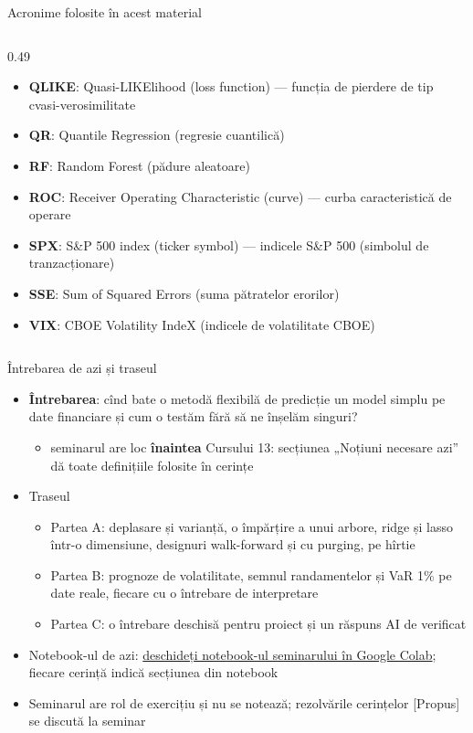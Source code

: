 \begin{frame}{Acronime folosite în acest material}
\begin{columns}[T]
\begin{column}{0.49\textwidth}
\begin{itemize}
    \item \textbf{QLIKE}: Quasi-LIKElihood (loss function) — funcția de pierdere de tip cvasi-verosimilitate
    \item \textbf{QR}: Quantile Regression (regresie cuantilică)
    \item \textbf{RF}: Random Forest (pădure aleatoare)
    \item \textbf{ROC}: Receiver Operating Characteristic (curve) — curba caracteristică de operare
    \item \textbf{SPX}: S\&P 500 index (ticker symbol) — indicele S\&P 500 (simbolul de tranzacționare)
    \item \textbf{SSE}: Sum of Squared Errors (suma pătratelor erorilor)
    \item \textbf{VIX}: CBOE Volatility IndeX (indicele de volatilitate CBOE)
\end{itemize}
\end{column}
\end{columns}
\end{frame}

\begin{frame}{Întrebarea de azi și traseul}
\itemsize{\small}
\begin{itemize}
    \item \textbf{Întrebarea}: cînd bate o metodă flexibilă de predicție un model simplu pe date financiare și cum o testăm fără să ne înșelăm singuri?
    \begin{itemize}
        \item seminarul are loc \textbf{înaintea} Cursului 13: secțiunea „Noțiuni necesare azi” dă toate definițiile folosite în cerințe
    \end{itemize}
    \item Traseul
    \begin{itemize}
        \item Partea A: deplasare și varianță, o împărțire a unui arbore, ridge și lasso într-o dimensiune, designuri walk-forward și cu purging, pe hîrtie
        \item Partea B: prognoze de volatilitate, semnul randamentelor și VaR 1\% pe date reale, fiecare cu o întrebare de interpretare
        \item Partea C: o întrebare deschisă pentru proiect și un răspuns AI de verificat
    \end{itemize}
    \item Notebook-ul de azi: \href{\nb}{deschideți notebook-ul seminarului în Google Colab}; fiecare cerință indică secțiunea din notebook
    \item Seminarul are rol de exercițiu și nu se notează; rezolvările cerințelor [Propus] se discută la seminar
\end{itemize}
\end{frame}

